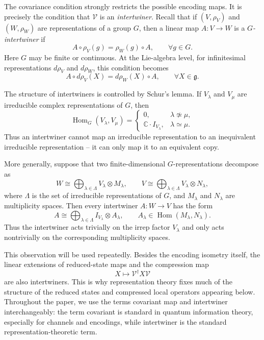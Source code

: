 \documentclass[10pt,twocolumn,superscriptaddress,aps,amsmath,amssymb,citeautoscript,floatfix,prx]{revtex4-2}
\newcounter{alg}
\theoremstyle{plain}
\theoremstyle{plain}
\theoremstyle{plain}
\theoremstyle{plain}
\theoremstyle{plain}
\theoremstyle{plain}
\theoremstyle{plain}
\theoremstyle{definition}
\theoremstyle{plain}
\begin{document}
The covariance condition strongly restricts the possible encoding maps. It is precisely the condition that $\mathcal{V}$ is an \textit{intertwiner}. 
Recall that if $(V,\rho_{V})$ and $(W,\rho_{W})$ are representations of a group $G$, then a linear map $A:V\to W$ is a \textit{$G$-intertwiner} if
\begin{equation}\label{eq:intertwiner_def}
A\circ\rho_{V}(g)
=
\rho_{W}(g)\circ A,
\qquad
\forall g\in G .
\end{equation}
Here $G$ may be finite or continuous. At the Lie-algebra level, for infinitesimal representations $d\rho_{V}$ and $d\rho_{W}$, this condition becomes
$$
A\circ d\rho_{V}(X)
=
d\rho_{W}(X)\circ A,
\qquad
\forall X\in\mathfrak g .
$$

The structure of intertwiners is controlled by Schur's lemma. If $V_\lambda$ and $V_\mu$ are irreducible complex representations of $G$, then
$$
\operatorname{Hom}_G(V_\lambda,V_\mu)
=
\begin{cases}
0, & \lambda\not\simeq\mu,\\
\mathbb C\cdot I_{V_\lambda}, & \lambda\simeq\mu .
\end{cases}
$$
Thus an intertwiner cannot map an irreducible representation to an inequivalent irreducible representation -- it can only map it to an equivalent copy.

More generally, suppose that two finite-dimensional $G$-representations decompose as
$$
W
\cong
\bigoplus_{\lambda\in\Lambda}
V_\lambda\otimes M_\lambda,
\qquad
V
\cong
\bigoplus_{\lambda\in\Lambda}
V_\lambda\otimes N_\lambda,
$$
where $\Lambda$ is the set of irreducible representations of $G$, and $M_\lambda$ and $N_\lambda$ are multiplicity spaces. Then every intertwiner $A:W\to V$ has the form
\begin{equation}\label{eq:intertwiner_decomp}
A
\cong
\bigoplus_{\lambda\in\Lambda}
I_{V_\lambda}\otimes A_\lambda,
\qquad
A_\lambda\in\operatorname{Hom}(M_\lambda,N_\lambda).
\end{equation}
Thus the intertwiner acts trivially on the irrep factor $V_\lambda$ and only acts nontrivially on the corresponding multiplicity spaces.

This observation will be used repeatedly. Besides the encoding isometry itself, the linear extensions of reduced-state maps and the compression map
$$
X
\longmapsto
\mathcal{V}^\dagger X \mathcal{V}
$$
are also intertwiners. This is why representation theory fixes much of the structure of the reduced states and compressed local operators appearing below. 
Throughout the paper, we use the terms covariant map and intertwiner interchangeably: the term covariant is standard in quantum information theory, 
especially for channels and encodings, while intertwiner is the standard representation-theoretic term.
\end{document}
